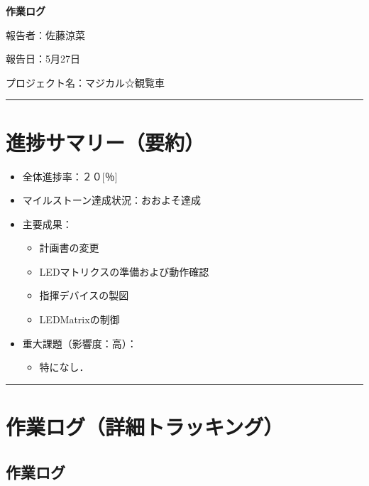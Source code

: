 \documentclass[uplatex,dvipdfmx,a4paper,11pt]{jsarticle}
\newcommand{\sectionrule}{\par\medskip\noindent\rule{\linewidth}{0.6pt}\par\medskip}
\begin{document}
{\LARGE\bfseries 作業ログ}\par\bigskip

報告者：佐藤涼菜

報告日：5月27日

プロジェクト名：マジカル☆観覧車

\sectionrule


\section{進捗サマリー（要約）}

\begin{itemize}
  \item 全体進捗率：２０[％]
  \item マイルストーン達成状況：おおよそ達成
  \item 主要成果：
    \begin{itemize}
      \item {計画書の変更}
      \item {LEDマトリクスの準備および動作確認}
      \item {指揮デバイスの製図}
      \item {LEDMatrixの制御}
    \end{itemize}
  \item 重大課題（影響度：高）：
    \begin{itemize}
      \item {特になし．}
    \end{itemize}
\end{itemize}

\sectionrule


\section{作業ログ（詳細トラッキング）}

\subsection{作業ログ}

\renewcommand{\arraystretch}{1.2}

\small
\end{document}
